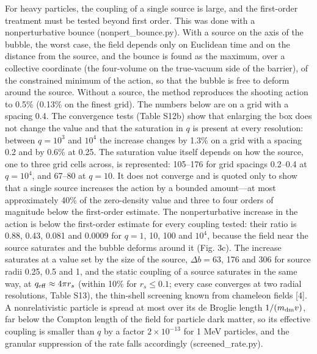 \documentclass[preprint,12pt]{elsarticle}
\begin{document}
For heavy particles, the coupling of a single source is large, and the first-order treatment must be tested beyond first order. This was done with a nonperturbative bounce (nonpert\_bounce.py). With a source on the axis of the bubble, the worst case, the field depends only on Euclidean time and on the distance from the source, and the bounce is found as the maximum, over a collective coordinate (the four-volume on the true-vacuum side of the barrier), of the constrained minimum of the action, so that the bubble is free to deform around the source. Without a source, the method reproduces the shooting action to 0.5\% (0.13\% on the finest grid). The numbers below are on a grid with a spacing 0.4. The convergence tests (Table S12b) show that enlarging the box does not change the value and that the saturation in $q$ is present at every resolution: between $q=10^3$ and $10^4$ the increase changes by 1.3\% on a grid with a spacing 0.2 and by 0.6\% at 0.25. The saturation value itself depends on how the source, one to three grid cells across, is represented: 105--176 for grid spacings 0.2--0.4 at $q=10^4$, and 67--80 at $q=10$. It does not converge and is quoted only to show that a single source increases the action by a bounded amount---at most approximately 40\% of the zero-density value and three to four orders of magnitude below the first-order estimate. The nonperturbative increase in the action is below the first-order estimate for every coupling tested: their ratio is 0.88, 0.43, 0.081 and 0.0009 for $q=1$, 10, 100 and $10^4$, because the field near the source saturates and the bubble deforms around it (Fig. 3c). The increase saturates at a value set by the size of the source, $\Delta b=63$, 176 and 306 for source radii 0.25, 0.5 and 1, and the static coupling of a source saturates in the same way, at $q_{\rm eff}\approx4\pi r_s$ (within 10\% for $r_s\le0.1$; every case converges at two radial resolutions, Table S13), the thin-shell screening known from chameleon fields [4]. A nonrelativistic particle is spread at most over its de Broglie length $1/(m_{\rm dm}v)$, far below the Compton length of the field for particle dark matter, so its effective coupling is smaller than $q$ by a factor $2\times10^{-13}$ for 1 MeV particles, and the granular suppression of the rate falls accordingly (screened\_rate.py).
\end{document}
